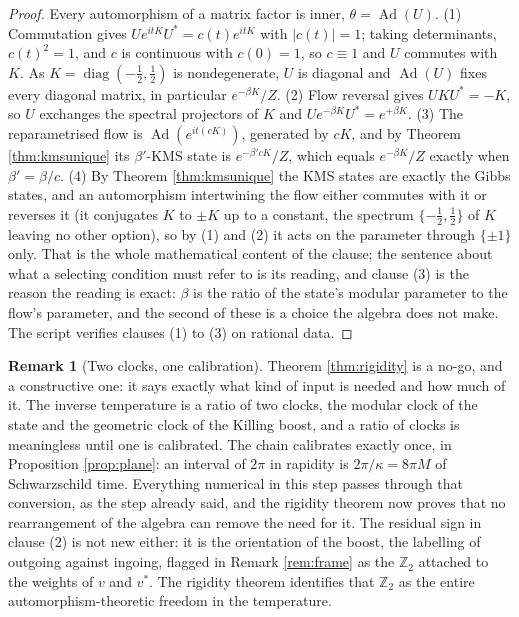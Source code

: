 \documentclass[11pt]{article}
\theoremstyle{definition}
\newtheorem{remark}[theorem]{Remark}
\begin{document}
\begin{proof}
Every automorphism of a matrix factor is inner, $\theta = \operatorname{Ad}(U)$. (1) Commutation gives $Ue^{itK}U^{*} = c(t)e^{itK}$ with $|c(t)| = 1$; taking determinants, $c(t)^{2} = 1$, and $c$ is continuous with $c(0) = 1$, so $c \equiv 1$ and $U$ commutes with $K$. As $K = \operatorname{diag}(-\tfrac12, \tfrac12)$ is nondegenerate, $U$ is diagonal and $\operatorname{Ad}(U)$ fixes every diagonal matrix, in particular $e^{-\beta K}/Z$. (2) Flow reversal gives $UKU^{*} = -K$, so $U$ exchanges the spectral projectors of $K$ and $Ue^{-\beta K}U^{*} = e^{+\beta K}$. (3) The reparametrised flow is $\operatorname{Ad}(e^{it(cK)})$, generated by $cK$, and by Theorem \ref{thm:kmsunique} its $\beta'$-KMS state is $e^{-\beta' cK}/Z$, which equals $e^{-\beta K}/Z$ exactly when $\beta' = \beta/c$. (4) By Theorem \ref{thm:kmsunique} the KMS states are exactly the Gibbs states, and an automorphism intertwining the flow either commutes with it or reverses it (it conjugates $K$ to $\pm K$ up to a constant, the spectrum $\{-\tfrac12, \tfrac12\}$ of $K$ leaving no other option), so by (1) and (2) it acts on the parameter through $\{\pm 1\}$ only. That is the whole mathematical content of the clause; the sentence about what a selecting condition must refer to is its reading, and clause (3) is the reason the reading is exact: $\beta$ is the ratio of the state's modular parameter to the flow's parameter, and the second of these is a choice the algebra does not make. The script verifies clauses (1) to (3) on rational data.
\end{proof}

\begin{remark}[Two clocks, one calibration]\label{rem:clocks}
Theorem \ref{thm:rigidity} is a no-go, and a constructive one: it says exactly what kind of input is needed and how much of it. The inverse temperature is a ratio of two clocks, the modular clock of the state and the geometric clock of the Killing boost, and a ratio of clocks is meaningless until one is calibrated. The chain calibrates exactly once, in Proposition \ref{prop:plane}: an interval of $2\pi$ in rapidity is $2\pi/\kappa = 8\pi M$ of Schwarzschild time. Everything numerical in this step passes through that conversion, as the step already said, and the rigidity theorem now proves that no rearrangement of the algebra can remove the need for it. The residual sign in clause (2) is not new either: it is the orientation of the boost, the labelling of outgoing against ingoing, flagged in Remark \ref{rem:frame} as the $\mathbb{Z}_2$ attached to the weights of $v$ and $v^{*}$. The rigidity theorem identifies that $\mathbb{Z}_2$ as the entire automorphism-theoretic freedom in the temperature.
\end{remark}
\end{document}
